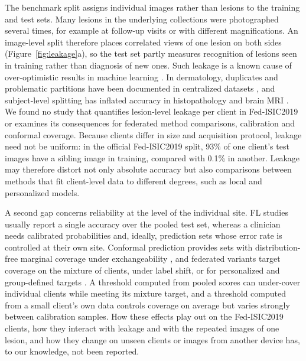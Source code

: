 \documentclass[VANCOUVER,Times1COL]{WileyNJDv5}
\begin{document}
The benchmark split assigns individual images rather than lesions to the training and test sets. Many
lesions in the underlying collections were photographed several times, for example at follow-up visits or
with different magnifications. An image-level split therefore places correlated views of one lesion on
both sides (Figure~\ref{fig:leakage}a), so the test set partly measures recognition of lesions seen in
training rather than diagnosis of new ones. Such leakage is a known cause of over-optimistic results in
machine learning \cite{kapoor2023leakage,varoquaux2022failures}. In dermatology, duplicates and
problematic partitions have been documented in centralized datasets
\cite{cassidy2022isic,groger2023reliable,abhishek2025dermamnist}, and subject-level splitting has
inflated accuracy in histopathology and brain MRI \cite{bussola2021tiles,yagis2021leakage}. We found no
study that quantifies lesion-level leakage per client in Fed-ISIC2019 or examines its consequences for
federated method comparisons, calibration and conformal coverage. Because clients differ in size and
acquisition protocol, leakage need not be uniform: in the official Fed-ISIC2019 split, 93\% of one
client's test images have a sibling image in training, compared with 0.1\% in another. Leakage may
therefore distort not only absolute accuracy but also comparisons between methods that fit client-level
data to different degrees, such as local and personalized models.

A second gap concerns reliability at the level of the individual site. FL studies usually report a
single accuracy over the pooled test set, whereas a clinician needs calibrated probabilities
\cite{guo2017calibration} and, ideally, prediction sets whose error rate is controlled at their own
site. Conformal prediction provides sets with distribution-free marginal coverage under exchangeability
\cite{vovk2005algorithmic,angelopoulos2023gentle}, and federated variants target coverage on the
mixture of clients, under label shift, or for personalized and group-defined targets
\cite{lu2023fcp,humbert2023oneshot,plassier2023labelshift,min2025pfcp,wen2026gcfcp}. A
threshold computed from pooled scores can under-cover individual clients while meeting its mixture
target, and a threshold computed from a small client's own data controls coverage on average but varies
strongly between calibration samples. How these effects play out on the Fed-ISIC2019 clients, how they
interact with leakage and with the repeated images of one lesion, and how they change on unseen clients
or images from another device has, to our knowledge, not been reported.
\end{document}
